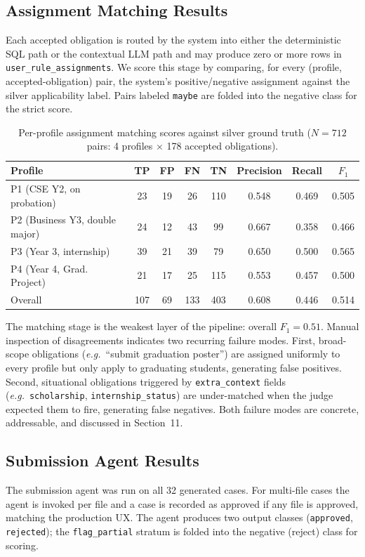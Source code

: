 \documentclass[a4paper,12pt]{article}
\begin{document}
\subsection{Assignment Matching Results}
Each accepted obligation is routed by the system into either the deterministic SQL path or the contextual LLM path and may produce zero or more rows in \texttt{user\_rule\_assignments}. We score this stage by comparing, for every (profile, accepted-obligation) pair, the system's positive/negative assignment against the silver applicability label. Pairs labeled \texttt{maybe} are folded into the negative class for the strict score.

\begin{table}[H]
\centering
\begin{tabular}{l|cccc|ccc}
Profile & TP & FP & FN & TN & Precision & Recall & $F_1$ \\ \hline
P1 (CSE Y2, on probation) & 23 & 19 & 26 & 110 & 0.548 & 0.469 & 0.505 \\
P2 (Business Y3, double major) & 24 & 12 & 43 & 99 & 0.667 & 0.358 & 0.466 \\
P3 (Year 3, internship) & 39 & 21 & 39 & 79 & 0.650 & 0.500 & 0.565 \\
P4 (Year 4, Grad. Project) & 21 & 17 & 25 & 115 & 0.553 & 0.457 & 0.500 \\ \hline
Overall & 107 & 69 & 133 & 403 & 0.608 & 0.446 & 0.514 \\
\end{tabular}
\caption{Per-profile assignment matching scores against silver ground truth ($N{=}712$ pairs: 4 profiles $\times$ 178 accepted obligations).}
\label{tab:matching_perprofile}
\end{table}

The matching stage is the weakest layer of the pipeline: overall $F_1{=}0.51$. Manual inspection of disagreements indicates two recurring failure modes. First, broad-scope obligations (\textit{e.g.}\ ``submit graduation poster'') are assigned uniformly to every profile but only apply to graduating students, generating false positives. Second, situational obligations triggered by \texttt{extra\_context} fields (\textit{e.g.}\ \texttt{scholarship}, \texttt{internship\_status}) are under-matched when the judge expected them to fire, generating false negatives. Both failure modes are concrete, addressable, and discussed in Section~11.

\subsection{Submission Agent Results}
The submission agent was run on all 32 generated cases. For multi-file cases the agent is invoked per file and a case is recorded as approved if any file is approved, matching the production UX. The agent produces two output classes (\texttt{approved}, \texttt{rejected}); the \texttt{flag\_partial} stratum is folded into the negative (reject) class for scoring.
\end{document}

